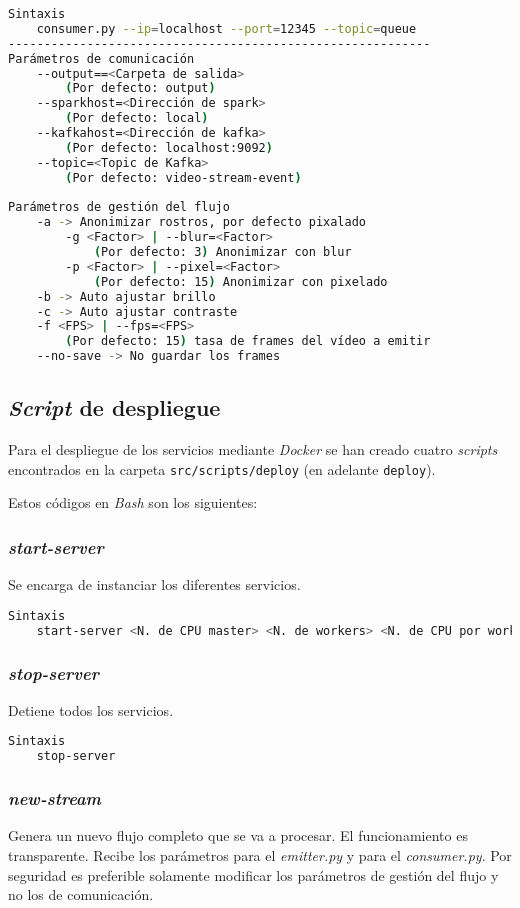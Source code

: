 \begin{lstlisting}[language=Bash]
Sintaxis
	consumer.py --ip=localhost --port=12345 --topic=queue 
-----------------------------------------------------------
Parámetros de comunicación
	--output==<Carpeta de salida> 
		(Por defecto: output)
	--sparkhost=<Dirección de spark>
		(Por defecto: local)
	--kafkahost=<Dirección de kafka> 
		(Por defecto: localhost:9092)
	--topic=<Topic de Kafka> 
		(Por defecto: video-stream-event)
		
Parámetros de gestión del flujo
	-a -> Anonimizar rostros, por defecto pixalado
		-g <Factor> | --blur=<Factor>
			(Por defecto: 3) Anonimizar con blur
		-p <Factor> | --pixel=<Factor>
			(Por defecto: 15) Anonimizar con pixelado
	-b -> Auto ajustar brillo
	-c -> Auto ajustar contraste
	-f <FPS> | --fps=<FPS> 
		(Por defecto: 15) tasa de frames del vídeo a emitir
	--no-save -> No guardar los frames
\end{lstlisting}

\subsection{\textit{Script} de despliegue}

Para el despliegue de los servicios mediante \textit{Docker} se han creado cuatro \textit{scripts} encontrados en la carpeta \texttt{src/scripts/deploy} (en adelante \texttt{deploy}).

Estos códigos en \textit{Bash} son los siguientes:

\subsubsection{\textit{start-server}}
Se encarga de instanciar los diferentes servicios.

\begin{lstlisting}[language=Bash]
Sintaxis
	start-server <N. de CPU master> <N. de workers> <N. de CPU por worker> <Memoria por worker>
\end{lstlisting}

\subsubsection{\textit{stop-server}}
Detiene todos los servicios.

\begin{lstlisting}[language=Bash]
Sintaxis
	stop-server
\end{lstlisting}

\subsubsection{\textit{new-stream}}
Genera un nuevo flujo completo que se va a procesar. El funcionamiento es transparente. Recibe los parámetros para el \textit{emitter.py} y para el \textit{consumer.py}. Por seguridad es preferible solamente modificar los parámetros de gestión del flujo y no los de comunicación.

